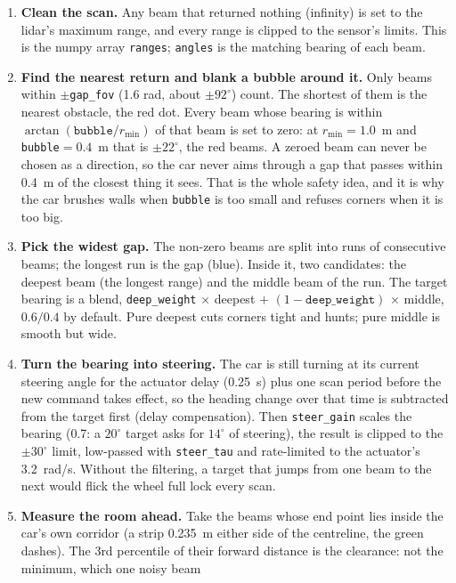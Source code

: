 \begin{enumerate}[leftmargin=*]
  \item \textbf{Clean the scan.} Any beam that returned nothing (infinity) is set to the lidar's
  maximum range, and every range is clipped to the sensor's limits. This is the numpy array
  \texttt{ranges}; \texttt{angles} is the matching bearing of each beam.
  \item \textbf{Find the nearest return and blank a bubble around it.} Only beams within
  $\pm$\texttt{gap\_fov} (1.6 rad, about $\pm 92^\circ$) count. The shortest of them is the
  nearest obstacle, the red dot. Every beam whose bearing is within
  $\arctan(\texttt{bubble}/r_{\min})$ of that beam is set to zero: at $r_{\min}=1.0$~m and
  \texttt{bubble}$=0.4$~m that is $\pm 22^\circ$, the red beams. A zeroed beam can never be
  chosen as a direction, so the car never aims through a gap that passes within 0.4~m of the
  closest thing it sees. That is the whole safety idea, and it is why the car brushes walls when
  \texttt{bubble} is too small and refuses corners when it is too big.
  \item \textbf{Pick the widest gap.} The non-zero beams are split into runs of consecutive
  beams; the longest run is the gap (blue). Inside it, two candidates: the deepest beam (the
  longest range) and the middle beam of the run. The target bearing is a blend,
  \texttt{deep\_weight} $\times$ deepest $+$ $(1-\texttt{deep\_weight})$ $\times$ middle, $0.6/0.4$
  by default. Pure deepest cuts corners tight and hunts; pure middle is smooth but wide.
  \item \textbf{Turn the bearing into steering.} The car is still turning at its current
  steering angle for the actuator delay (0.25~s) plus one scan period before the new command
  takes effect, so the heading change over that time is subtracted from the target first
  (delay compensation). Then \texttt{steer\_gain} scales the bearing (0.7: a $20^\circ$ target
  asks for $14^\circ$ of steering), the result is clipped to the $\pm 30^\circ$ limit, low-passed
  with \texttt{steer\_tau} and rate-limited to the actuator's 3.2~rad/s. Without the filtering,
  a target that jumps from one beam to the next would flick the wheel full lock every scan.
  \item \textbf{Measure the room ahead.} Take the beams whose end point lies inside the car's
  own corridor (a strip 0.235~m either side of the centreline, the green dashes). The 3rd
  percentile of their forward distance is the clearance: not the minimum, which one noisy beam

\end{enumerate}
